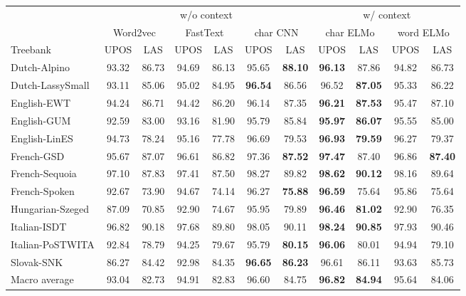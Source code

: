 \begin{table}[t]
	\label{tbl:seq:ablation}
	\vspace{0.5em}\centering\wuhao
	\begin{tabular}{p{2.8cm} | cc cc cc | cc cc}
		\hline
		& \multicolumn{6}{c|}{w/o context} & \multicolumn{4}{c}{w/ context} \\
		& \multicolumn{2}{c}{Word2vec} & \multicolumn{2}{c}{FastText} & \multicolumn{2}{c|}{char CNN} &   \multicolumn{2}{c}{char ELMo} & \multicolumn{2}{c}{word ELMo} \\
		Treebank &  UPOS & LAS &  UPOS & LAS & UPOS & LAS & UPOS & LAS  & UPOS & LAS \\
		\hline
		Dutch-Alpino & 93.32 & 86.73 & 94.69 & 86.13 & 95.65 & \bf 88.10 & \bf 96.13 & 87.86 & 94.82 & 86.73 \\
		Dutch-LassySmall & 93.11 & 85.06 & 95.02 & 84.95 & \bf 96.54 & 86.56 & 96.52 & \bf 87.05 & 95.33 & 86.22 \\
		English-EWT & 94.24 & 86.71 & 94.42 & 86.20 & 96.14 & 87.35 & \bf 96.21 & \bf 87.53 & 95.47 & 87.10 \\
		English-GUM & 92.59 & 83.00 & 93.16 & 81.90 & 95.79 & 85.84 & \bf 95.97 & \bf 86.07 & 95.55 & 85.00 \\
		English-LinES & 94.73 & 78.24 & 95.16 & 77.78 & 96.69 & 79.53 & \bf 96.93 & \bf 79.59 & 96.27 & 79.37 \\
		French-GSD & 95.67 & 87.07 & 96.61 & 86.82 & 97.36 & \bf 87.52 & \bf 97.47 & 87.40 & 96.86 & \bf 87.40\\
		French-Sequoia & 97.10 & 87.83 & 97.41 & 87.50 & 98.27 & 89.82 & \bf 98.62 & \bf 90.12 & 98.16 & 89.64 \\
		French-Spoken & 92.67 & 73.90 & 94.67 & 74.14 & 96.27 & \bf 75.88 & \bf 96.59 & 75.64 & 95.86 & 75.64 \\
		Hungarian-Szeged & 87.09 & 70.85 & 92.90 & 74.67 & 95.95 & 79.89 & \bf 96.46 & \bf 81.02 & 92.90 & 76.35 \\
		Italian-ISDT & 96.82 & 90.18 & 97.68 & 89.80 & 98.05 & 90.11 & \bf 98.24 & \bf 90.85 & 97.93 & 90.46 \\
		Italian-PoSTWITA & 92.84 & 78.79 & 94.25 & 79.67 & 95.79 & \bf 80.15 & \bf 96.06 & 80.01 & 94.94 & 79.10 \\
		Slovak-SNK & 86.27 & 84.42 & 92.98 & 84.35 & \bf 96.65 & \bf 86.23 & 96.61 & 86.11 & 93.63 & 85.73 \\
		\hline
		Macro average & 93.04 & 82.73 & 94.91 & 82.83 & 96.60 & 84.75& \bf 96.82 & \bf 84.94 & 95.64 & 84.06 \\

\end{tabular}
\end{table}
